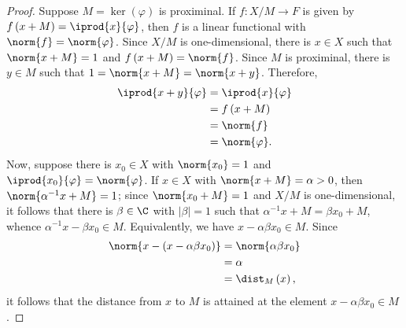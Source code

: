 \documentclass[10pt]{mypackage}
\begin{document}
\begin{proof}
  Suppose $M = \ker\left( \varphi \right)$ is proximinal. If $f\colon X/M\rightarrow F$ is given by $f\left( x + M \right) = \iprod{x}{\varphi}$, then $f$ is a linear functional with $\norm{f} = \norm{\varphi}$. Since $X/M$ is one-dimensional, there is $x\in X$ such that $\norm{x + M} = 1$ and $f\left( x + M \right) = \norm{f}$. Since $M$ is proximinal, there is $y\in M$ such that $1 = \norm{x + M} = \norm{x + y}$. Therefore,
  \begin{align*}
    \iprod{x + y}{\varphi} &= \iprod{x}{\varphi}\\
                           &= f\left( x + M \right)\\
                           &= \norm{f}\\
                           &= \norm{\varphi}.
  \end{align*}
  Now, suppose there is $x_0\in X$ with $\norm{x_0} = 1$ and $ \iprod{x_0}{\varphi} = \norm{\varphi} $. If $x\in X$ with $\norm{x + M} = \alpha > 0$, then $\norm{\alpha^{-1}x + M} = 1$; since $\norm{x_0 + M} = 1$ and $X/M$ is one-dimensional, it follows that there is $\beta\in \C$ with $\left\vert \beta \right\vert = 1$ such that $\alpha^{-1}x + M = \beta x_0 + M$, whence $\alpha^{-1}x - \beta x_0\in M$. Equivalently, we have $x-\alpha\beta x_0 \in M$. Since
  \begin{align*}
    \norm{x-\left( x-\alpha\beta x_0 \right)} &= \norm{\alpha\beta x_0}\\
                                              &= \alpha\\
                                              &= \dist_M\left( x \right),
  \end{align*}
  it follows that the distance from $x$ to $M$ is attained at the element $x-\alpha\beta x_0\in M$.
\end{proof}
\end{document}
